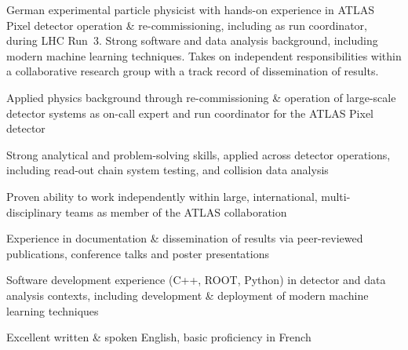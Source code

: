 

\begin{center}
  \begin{minipage}{0.9\textwidth}
    German experimental particle physicist with hands-on experience in ATLAS Pixel detector operation \& re-commissioning, including as run coordinator, during LHC Run~3.
Strong software and data analysis background, including modern machine learning techniques.
Takes on independent responsibilities within a collaborative research group with a track record of dissemination of results.
  \end{minipage}
\end{center}


\begin{cvitems}[0mm]
  \item
    Applied physics background through \textcolor{awesome-light}{re-commissioning \& operation of large-scale detector systems} as on-call expert and run coordinator for the ATLAS Pixel detector
  \item
    Strong \textcolor{awesome-light}{analytical and problem-solving skills}, applied across detector operations, including read-out chain system testing, and collision data analysis
  \item
    Proven ability to \textcolor{awesome-light}{work independently} within large, international, multi-disciplinary teams as member of the ATLAS collaboration
  \item
    Experience in \textcolor{awesome-light}{documentation \& dissemination of results} via peer-reviewed publications, conference talks and poster presentations
  \item
    Software development experience (C++, ROOT, Python) in detector and data analysis contexts, including development \& deployment of modern machine learning techniques
  \item
    Excellent written \& spoken English, basic proficiency in French
\end{cvitems}

